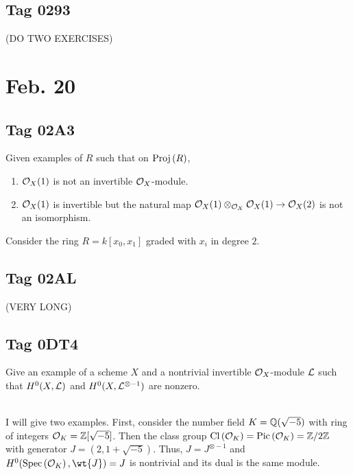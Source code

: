 \documentclass[12pt]{article}
\begin{document}
\subsection{Tag 0293}

(DO TWO EXERCISES)

\section{Feb. 20}

\subsection{Tag 02A3}

\begin{exr}
Given examples of $R$ such that on $\mathrm{Proj}\left( R \right)$,
\begin{enumerate}
\item $\mathcal{O}_{X}(1)$ is not an invertible $\mathcal{O}_{X}$-module.
\item $\mathcal{O}_{X}(1)$ is invertible but the natural map $\mathcal{O}_{X}(1) \otimes_{\mathcal{O}_{X}} \mathcal{O}_{X}(1) \to \mathcal{O}_{X}(2)$ is not an isomorphism.
\end{enumerate}
\end{exr}
\noindent
Consider the ring $R = k[x_0, x_1]$ graded with $x_i$ in degree $2$. 

\subsection{Tag 02AL}

(VERY LONG)

\subsection{Tag 0DT4}

\begin{exr}
Give an example of a scheme $X$ and a nontrivial invertible $\mathcal{O}_{X}$-module $\mathcal{L}$ such that $H^0(X, \mathcal{L})$ and $H^0(X, \mathcal{L}^{\otimes -1})$ are nonzero.  
\end{exr}
\noindent\\
I will give two examples. First, consider the number field $K = \mathbb{Q}(\sqrt{-5})$ with ring of integers $\mathcal{O}_{K} = \mathbb{Z}[\sqrt{-5}]$. Then the class group $\mathrm{Cl} \left( \mathcal{O}_{K} \right) = \mathrm{Pic} \left( \mathcal{O}_{K} \right) = \mathbb{Z} / 2 \mathbb{Z}$ with generator $J = (2, 1 + \sqrt{-5})$. Thus, $J = J^{\otimes - 1}$ and $H^0(\Spec{\struct{K}}, \wt{J}) = J$ is nontrivial and its dual is the same module. 
\bigskip\\
\end{document}
